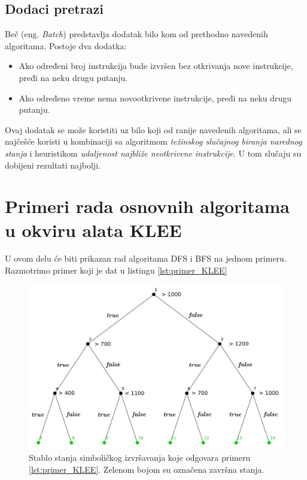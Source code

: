 \documentclass[12pt,oneside]{memoir}
\begin{document}
\subsection{Dodaci pretrazi} 
Beč (eng. \textit{Batch}) predstavlja dodatak bilo kom od prethodno navedenih algoritama. Postoje dva dodatka:
\begin{itemize}
    \item Ako određeni broj instrukcija bude izvršen bez otkrivanja nove instrukcije, pređi na neku drugu putanju.
    
    \item Ako određeno vreme nema novootkrivene instrukcije, pređi na neku drugu putanju.
\end{itemize}
Ovaj dodatak se može koristiti uz bilo koji od ranije navedenih algoritama, ali se najčešće koristi u kombinaciji sa algoritmom \textit{težinskog slučajnog biranja narednog stanja} i heuristikom \textit{udaljenost najbliže neotkrivene instrukcije}. U tom slučaju su dobijeni rezultati najbolji.

\newpage

\section{Primeri rada osnovnih algoritama u okviru alata KLEE} \label{osnovni_algoritmi}
U ovom delu će biti prikazan rad algoritama DFS i BFS na jednom primeru. Razmotrimo primer koji je dat u listingu \ref{lst:primer_KLEE}

\vskip 1.5in

\begin{figure}[ht]
    \centering
    \includegraphics[width=\linewidth]{stablo_primer_1.png}
    \caption{Stablo stanja simboličkog izvršavanja koje odgovara primeru \ref{lst:primer_KLEE}. Zelenom bojom su označena završna stanja.}
    \label{fig:moj_primer}
\end{figure}
\end{document}
